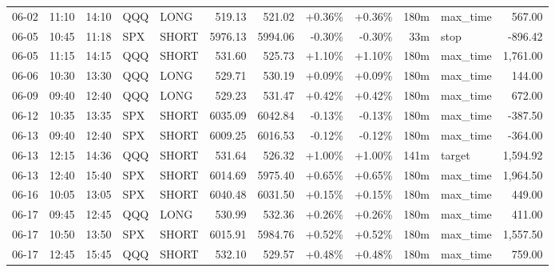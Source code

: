 \documentclass[11pt,a4paper]{article}
\begin{document}
\begin{center}
\begin{longtable}{>{\color{txtmain}}l l l l l r r r r r >{\color{txtmain}}l r}
06-02 & 11:10 & 14:10 & QQQ & LONG & 519.13 & 521.02 & \textcolor{wingreen}{+0.36\%} & \textcolor{wingreen}{+0.36\%} & 180m & max\_time & \textcolor{wingreen}{567.00} \\
06-05 & 10:45 & 11:18 & SPX & SHORT & 5976.13 & 5994.06 & \textcolor{lossred}{-0.30\%} & \textcolor{lossred}{-0.30\%} & 33m & stop & \textcolor{lossred}{-896.42} \\
06-05 & 11:15 & 14:15 & QQQ & SHORT & 531.60 & 525.73 & \textcolor{wingreen}{+1.10\%} & \textcolor{wingreen}{+1.10\%} & 180m & max\_time & \textcolor{wingreen}{1,761.00} \\
06-06 & 10:30 & 13:30 & QQQ & LONG & 529.71 & 530.19 & \textcolor{wingreen}{+0.09\%} & \textcolor{wingreen}{+0.09\%} & 180m & max\_time & \textcolor{wingreen}{144.00} \\
06-09 & 09:40 & 12:40 & QQQ & LONG & 529.23 & 531.47 & \textcolor{wingreen}{+0.42\%} & \textcolor{wingreen}{+0.42\%} & 180m & max\_time & \textcolor{wingreen}{672.00} \\
06-12 & 10:35 & 13:35 & SPX & SHORT & 6035.09 & 6042.84 & \textcolor{lossred}{-0.13\%} & \textcolor{lossred}{-0.13\%} & 180m & max\_time & \textcolor{lossred}{-387.50} \\
06-13 & 09:40 & 12:40 & SPX & SHORT & 6009.25 & 6016.53 & \textcolor{lossred}{-0.12\%} & \textcolor{lossred}{-0.12\%} & 180m & max\_time & \textcolor{lossred}{-364.00} \\
06-13 & 12:15 & 14:36 & QQQ & SHORT & 531.64 & 526.32 & \textcolor{wingreen}{+1.00\%} & \textcolor{wingreen}{+1.00\%} & 141m & target & \textcolor{wingreen}{1,594.92} \\
06-13 & 12:40 & 15:40 & SPX & SHORT & 6014.69 & 5975.40 & \textcolor{wingreen}{+0.65\%} & \textcolor{wingreen}{+0.65\%} & 180m & max\_time & \textcolor{wingreen}{1,964.50} \\
06-16 & 10:05 & 13:05 & SPX & SHORT & 6040.48 & 6031.50 & \textcolor{wingreen}{+0.15\%} & \textcolor{wingreen}{+0.15\%} & 180m & max\_time & \textcolor{wingreen}{449.00} \\
06-17 & 09:45 & 12:45 & QQQ & LONG & 530.99 & 532.36 & \textcolor{wingreen}{+0.26\%} & \textcolor{wingreen}{+0.26\%} & 180m & max\_time & \textcolor{wingreen}{411.00} \\
06-17 & 10:50 & 13:50 & SPX & SHORT & 6015.91 & 5984.76 & \textcolor{wingreen}{+0.52\%} & \textcolor{wingreen}{+0.52\%} & 180m & max\_time & \textcolor{wingreen}{1,557.50} \\
06-17 & 12:45 & 15:45 & QQQ & SHORT & 532.10 & 529.57 & \textcolor{wingreen}{+0.48\%} & \textcolor{wingreen}{+0.48\%} & 180m & max\_time & \textcolor{wingreen}{759.00} \\

\end{longtable}
\end{center}
\end{document}
